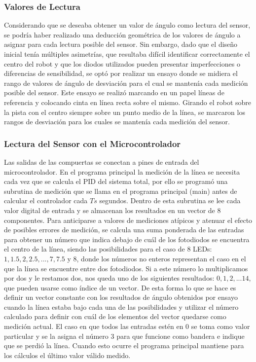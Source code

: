 \documentclass[10pt,conference,a4paper,onecolumn]{article}%
\begin{document}
\subsubsection{Valores de Lectura}
Considerando que se deseaba obtener un valor de ángulo como lectura del sensor, se podría haber realizado una deducción geométrica de los valores de ángulo a asignar para cada lectura posible del sensor. Sin embargo, dado que el diseño inicial tenía múltiples asimetrías, que resultaba difícil identificar correctamente el centro del robot y que los diodos utilizados pueden presentar imperfecciones o diferencias de sensibilidad, se optó por realizar un ensayo donde se midiera el rango de valores de ángulo de desviación para el cual se mantenía cada medición posible del sensor. Este ensayo se realizó marcando en un papel líneas de referencia y colocando cinta en línea recta sobre el mismo. Girando el robot sobre la pista con el centro siempre sobre un punto medio de la línea, se marcaron los rangos de desviación para los cuales se mantenía cada medición del sensor.
\subsubsection{Lectura del Sensor con el Microcontrolador}
Las salidas de las compuertas se conectan a pines de entrada del microcontrolador. En el programa principal la medición de la línea se necesita cada vez que se calcula el PID del sistema total, por ello se programó una subrutina de medición que se llama en el programa principal (main) antes de calcular el controlador cada $Ts$ segundos. Dentro de esta subrutina se lee cada valor digital de entrada y se almacenan los resultados en un vector de 8 componentes. Para anticiparse a valores de mediciones atípicos y atenuar el efecto de posibles errores de medición, se calcula una suma ponderada de las entradas para obtener un número que indica debajo de cuál de los fotodiodos se encuentra el centro de la línea, siendo las posibilidades para el caso de 8 LEDs: $1, 1.5, 2, 2.5,...,7,7.5$ y $8$, donde los números no enteros representan el caso en el que la línea se encuentre entre dos fotodiodos. Si a este número lo multiplicamos por dos y le restamos dos, nos queda uno de los siguientes resultados: $0,1,2,...14$, que pueden usarse como índice de un vector. De esta forma lo que se hace es definir un vector constante con los resultados de ángulo obtenidos por ensayo cuando la línea estaba bajo cada una de las posibilidades y utilizar el número calculado para definir con cuál de los elementos del vector quedarse como medición actual. El caso en que todos
las entradas estén en $0$ se toma como valor particular y se la asigna el número 3 para que funcione como bandera e indique que se perdió la línea. Cuando esto ocurre el programa principal mantiene para los cálculos el último valor válido medido.
\end{document}
